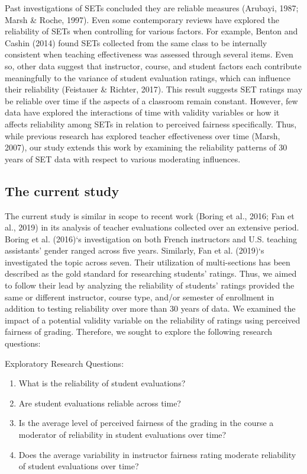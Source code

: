 \documentclass[
  man]{apa7}
\providecommand{\tightlist}{%
  \setlength{\itemsep}{0pt}\setlength{\parskip}{0pt}}
\begin{document}
Past investigations of SETs concluded they are reliable measures
(Arubayi, 1987; Marsh \& Roche, 1997). Even some contemporary reviews have explored
the reliability of SETs when controlling for various factors. For
example, Benton and Cashin (2014) found SETs collected from the same class to be
internally consistent when teaching effectiveness was assessed through
several items. Even so, other data suggest that instructor, course, and
student factors each contribute meaningfully to the variance of student
evaluation ratings, which can influence their reliability
(Feistauer \& Richter, 2017). This result suggests SET ratings may be reliable over
time if the aspects of a classroom remain constant. However, few data
have explored the interactions of time with validity variables or how it
affects reliability among SETs in relation to perceived fairness
specifically. Thus, while previous research has explored teacher
effectiveness over time (Marsh, 2007), our study extends this work by
examining the reliability patterns of 30 years of SET data with respect
to various moderating influences.

\hypertarget{the-current-study}{%
\subsection{The current study}\label{the-current-study}}

The current study is similar in scope to recent work (Boring et al., 2016; Fan et al., 2019) in its analysis of teacher evaluations collected over an
extensive period. Boring et al. (2016)`s investigation on both French instructors
and U.S. teaching assistants' gender ranged across five years.
Similarly, Fan et al. (2019)`s investigated the topic across seven. Their
utilization of multi-sections has been described as the gold standard
for researching students' ratings. Thus, we aimed to follow their lead
by analyzing the reliability of students' ratings provided the same or
different instructor, course type, and/or semester of enrollment in
addition to testing reliability over more than 30 years of data. We
examined the impact of a potential validity variable on the reliability
of ratings using perceived fairness of grading. Therefore, we sought to
explore the following research questions:

Exploratory Research Questions:

\begin{enumerate}
\def\labelenumi{\arabic{enumi})}
\tightlist
\item
  What is the reliability of student evaluations?
\item
  Are student evaluations reliable across time?
\item
  Is the average level of perceived fairness of the grading in the
  course a moderator of reliability in student evaluations over time?
\item
  Does the average variability in instructor fairness rating moderate
  reliability of student evaluations over time?
\end{enumerate}
\end{document}
